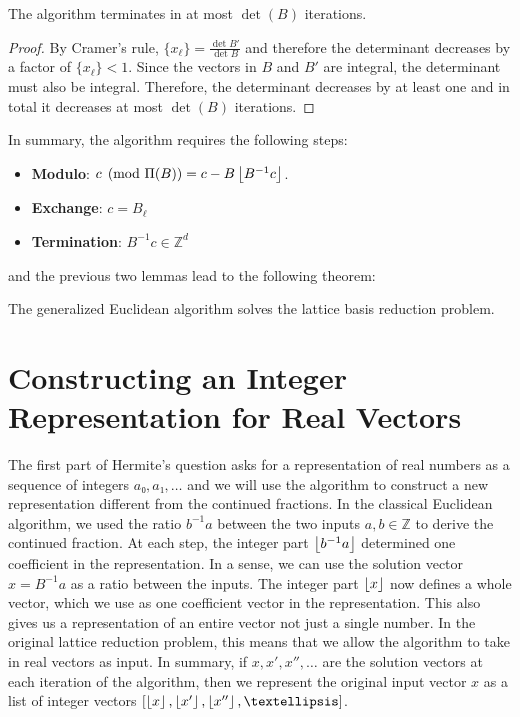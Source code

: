 \begin{lemma}
  The algorithm terminates in at most $\det(B)$ iterations.
\end{lemma}

\begin{proof}
  By Cramer's rule, $\{x_ℓ\} = \frac{\det B'}{\det B}$
  and therefore the determinant decreases by a factor of $\{x_ℓ\} < 1$.
  Since the vectors in $B$ and $B'$ are integral, the determinant must also be integral.
  Therefore, the determinant decreases by at least one and in total it
  decreases at most $\det(B)$ iterations.
\end{proof}

In summary, the algorithm requires the following steps:
\begin{itemize}
  \item \textbf{Modulo}: $c \pmod{\Pi(B)} = c - B \left\lfloor B^{-1} c\right\rfloor$.
  \item \textbf{Exchange}: $c = B_ℓ$
  \item \textbf{Termination}: $B^{-1} c ∈ ℤ^d$
\end{itemize}
and the previous two lemmas lead to the following theorem:

\begin{theorem}
  The generalized Euclidean algorithm solves the lattice basis reduction problem.
\end{theorem}

\section{Constructing an Integer Representation for Real Vectors}

The first part of Hermite's question asks for a representation of real numbers
as a sequence of integers $a₀, a₁, …$ and we will use the algorithm to
construct a new representation different from the continued fractions.
In the classical Euclidean algorithm,
we used the ratio $b^{-1}a$ between the two inputs $a, b ∈ ℤ$ to derive the continued fraction.
At each step, the integer part $\left\lfloor b^{-1} a\right\rfloor$ determined one coefficient in
the representation.
In a sense, we can use the solution vector $x = B^{-1}a$ as a ratio between the inputs.
The integer part $\left\lfloor x\right\rfloor$ now defines a whole vector, which we use as
one coefficient vector in the representation.
This also gives us a representation of an entire vector not just a single number.
In the original lattice reduction problem, this means that we allow the
algorithm to take in real vectors as input.
In summary, if $x, x', x'', …$ are the solution vectors at each iteration of the algorithm,
then we represent the original input vector $x$ as a list of integer vectors $\left[\floor{x}, \floor{x'}, \floor{x''}, …\right]$.

